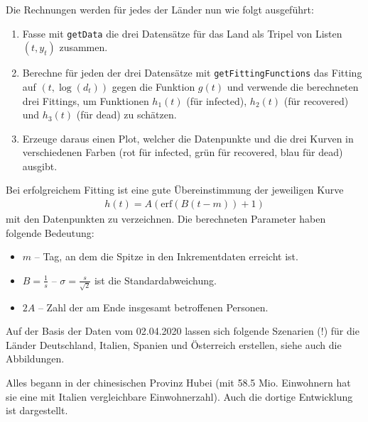 \documentclass[a4paper,11pt]{article}
\newcommand{\br}[1]{\left(#1\right)}
\newcommand{\erf}{\mathrm{erf}}
\begin{document}
Die Rechnungen werden für jedes der Länder nun wie folgt ausgeführt:
\begin{enumerate}
\item Fasse mit \texttt{getData} die drei Datensätze für das Land als Tripel
  von Listen $(t,y_t)$ zusammen. 
\item Berechne für jeden der drei Datensätze mit \texttt{getFittingFunctions}
  das Fitting auf $(t,\log(d_t))$ gegen die Funktion $g(t)$ und verwende die
  berechneten drei Fittings, um Funktionen $h_1(t)$ (für infected), $h_2(t)$
  (für recovered) und $h_3(t)$ (für dead) zu schätzen.
\item Erzeuge daraus einen Plot, welcher die Datenpunkte und die drei Kurven
  in verschiedenen Farben (rot für infected, grün für recovered, blau für
  dead) ausgibt.  
\end{enumerate}
Bei erfolgreichem Fitting ist eine gute Übereinstimmung der jeweiligen Kurve
\begin{gather*}
  h(t)=A\br{\erf\br{B(t-m)}+1}
\end{gather*}
mit den Datenpunkten zu verzeichnen.  Die berechneten Parameter haben folgende
Bedeutung:
\begin{itemize}
\item $m$ -- Tag, an dem die Spitze in den Inkrementdaten erreicht ist.
\item $B=\frac{1}{s}$ -- $\sigma=\frac{s}{\sqrt{2}}$ ist die
  Standardabweichung.
\item $2A$ -- Zahl der am Ende insgesamt betroffenen Personen. 
\end{itemize}

Auf der Basis der Daten vom 02.04.2020 lassen sich folgende Szenarien (!) für
die Länder Deutschland, Italien, Spanien und Österreich erstellen, siehe auch
die Abbildungen.

Alles begann in der chinesischen Provinz Hubei (mit 58.5 Mio. Einwohnern hat
sie eine mit Italien vergleichbare Einwohnerzahl).  Auch die dortige
Entwicklung ist dargestellt.
\end{document}

